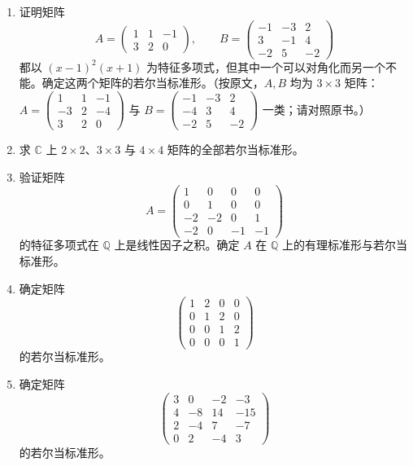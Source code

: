 \begin{enumerate}
\item 证明矩阵
\[
A = \begin{pmatrix} 1 & 1 & -1 \\ 3 & 2 & 0 \end{pmatrix}, \qquad B = \begin{pmatrix} -1 & -3 & 2 \\ 3 & -1 & 4 \\ -2 & 5 & -2 \end{pmatrix}
\]
都以 \((x-1)^2(x+1)\) 为特征多项式，但其中一个可以对角化而另一个不能。确定这两个矩阵的若尔当标准形。（按原文，\(A, B\) 均为 \(3 \times 3\) 矩阵：\(A = \begin{pmatrix}1&1&-1\\-3&2&-4\\3&2&0\end{pmatrix}\) 与 \(B = \begin{pmatrix}-1&-3&2\\-4&3&4\\-2&5&-2\end{pmatrix}\) 一类；请对照原书。）

\item 求 \(\mathbb{C}\) 上 \(2 \times 2\)、\(3 \times 3\) 与 \(4 \times 4\) 矩阵的全部若尔当标准形。

\item 验证矩阵
\[
A = \begin{pmatrix} 1 & 0 & 0 & 0 \\ 0 & 1 & 0 & 0 \\ -2 & -2 & 0 & 1 \\ -2 & 0 & -1 & -1 \end{pmatrix}
\]
的特征多项式在 \(\mathbb{Q}\) 上是线性因子之积。确定 \(A\) 在 \(\mathbb{Q}\) 上的有理标准形与若尔当标准形。

\item 确定矩阵
\[
\begin{pmatrix} 1 & 2 & 0 & 0 \\ 0 & 1 & 2 & 0 \\ 0 & 0 & 1 & 2 \\ 0 & 0 & 0 & 1 \end{pmatrix}
\]
的若尔当标准形。

\item 确定矩阵
\[
\begin{pmatrix} 3 & 0 & -2 & -3 \\ 4 & -8 & 14 & -15 \\ 2 & -4 & 7 & -7 \\ 0 & 2 & -4 & 3 \end{pmatrix}
\]
的若尔当标准形。


\end{enumerate}
